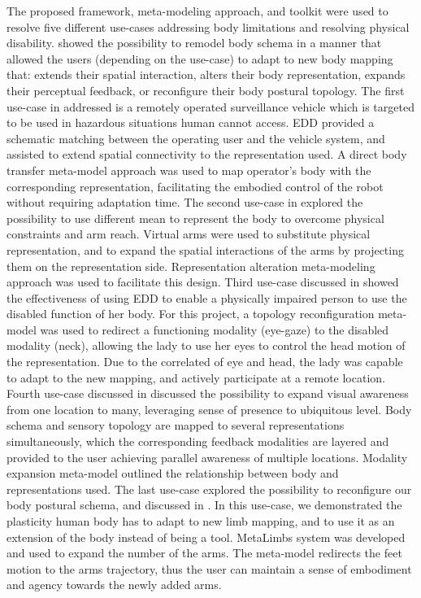 The proposed framework, meta-modeling approach, and toolkit were used to resolve five different use-cases addressing body limitations and resolving physical disability.  showed the possibility to remodel body schema in a manner that allowed the users (depending on the use-case) to adapt to new body mapping that: extends their spatial interaction, alters their body representation, expands their perceptual feedback, or reconfigure their body postural topology. The first use-case in  addressed is a remotely operated surveillance vehicle which is targeted to be used in hazardous situations human cannot access. EDD provided a schematic matching between the operating user and the vehicle system, and assisted to extend spatial connectivity to the representation used. A direct body transfer meta-model approach was used to map operator's body with the corresponding representation, facilitating the embodied control of the robot without requiring adaptation time. The second use-case in  explored the possibility to use different mean to represent the body to overcome physical constraints and arm reach. Virtual arms were used to substitute physical representation, and to expand the spatial interactions of the arms by projecting them on the representation side. Representation alteration meta-modeling approach was used to facilitate this design. Third use-case discussed in  showed the effectiveness of using EDD to enable a physically impaired person to use the disabled function of her body. For this project, a topology reconfiguration meta-model was used to redirect a functioning modality (eye-gaze) to the disabled modality (neck), allowing the lady to use her eyes to control the head motion of the representation. Due to the correlated of eye and head, the lady was capable to adapt to the new mapping, and actively participate at a remote location. Fourth use-case discussed in  discussed the possibility to expand visual awareness from one location to many, leveraging sense of presence to ubiquitous level. Body schema and sensory topology are mapped to several representations simultaneously, which the corresponding feedback modalities are layered and provided to the user achieving parallel awareness of multiple locations. Modality expansion meta-model outlined the relationship between body and representations used. The last use-case explored the possibility to reconfigure our body postural schema, and discussed in . In this use-case, we demonstrated the plasticity human body has to adapt to new limb mapping, and to use it as an extension of the body instead of being a tool. MetaLimbs system was developed and used to expand the number of the arms. The meta-model redirects the feet motion to the arms trajectory, thus the user can maintain a sense of embodiment and agency towards the newly added arms. 

